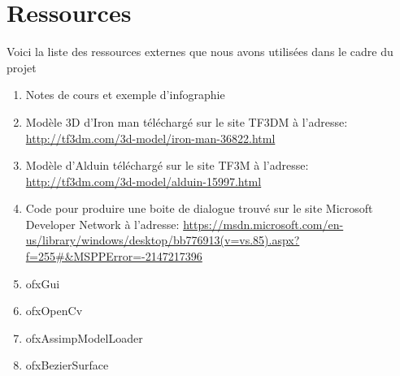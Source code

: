 \chapter{Ressources}
\label{s:ressources}

Voici la liste des ressources externes que nous avons utilisées dans le cadre du projet
\begin{enumerate}
	\item Notes de cours et exemple d'infographie 
	\item Modèle 3D d'Iron man téléchargé sur le site TF3DM à l'adresse:  \url{http://tf3dm.com/3d-model/iron-man-36822.html}
	\item Modèle d'Alduin téléchargé sur le site TF3M à l'adresse: 
	\url{http://tf3dm.com/3d-model/alduin-15997.html}
	\item Code pour produire une boite de dialogue trouvé sur le site Microsoft Developer Network à l'adresse: \url{https://msdn.microsoft.com/en-us/library/windows/desktop/bb776913(v=vs.85).aspx?f=255#\&MSPPError=-2147217396}
	\item ofxGui
	\item ofxOpenCv
	\item ofxAssimpModelLoader
	\item ofxBezierSurface
\end{enumerate}